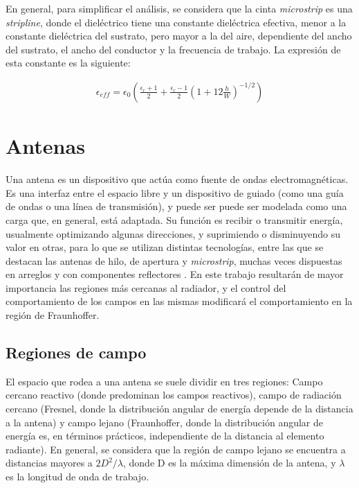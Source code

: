 En general, para simplificar el análisis, se considera que la cinta \textit{microstrip} es una \textit{stripline}, donde el dieléctrico tiene una constante dieléctrica efectiva, menor a la constante dieléctrica del sustrato, pero mayor a la del aire, dependiente del ancho del sustrato, el ancho del conductor y la frecuencia de trabajo. La expresión de esta constante es la siguiente:

\begin{align}
	\epsilon_{eff} = \epsilon_0 \left(\frac{\epsilon_r+1}{2} + \frac{\epsilon_r-1}{2} \left( 1+12 \frac{h}{W} \right)^{-1/2} \right)
	\label{eq:cte-diel-efectiva-microstrip}
\end{align}

\section{Antenas}
\label{subsec_antenas}

Una antena es un dispositivo que actúa como fuente de ondas electromagnéticas. Es una interfaz entre el espacio libre y un dispositivo de guiado (como una guía de ondas o una línea de transmisión), y puede ser puede ser modelada como una carga que, en general, está adaptada. Su función es recibir o transmitir energía, usualmente optimizando algunas direcciones, y suprimiendo o disminuyendo su valor en otras, para lo que se utilizan distintas tecnologías, entre las que se destacan las antenas de hilo, de apertura y \textit{microstrip}, muchas veces dispuestas en arreglos y con componentes reflectores \cite{Balanis:Theory}. En este trabajo resultarán de mayor importancia las regiones más cercanas al radiador, y el control del comportamiento de los campos en las mismas modificará el comportamiento en la región de Fraunhoffer.

\subsection{Regiones de campo}
\label{subsubsec_regiones_de_campo}
El espacio que rodea a una antena se suele dividir en tres regiones: Campo cercano reactivo (donde predominan los campos reactivos), campo de radiación cercano (Fresnel, donde la distribución angular de energía depende de la distancia a la antena) y campo lejano (Fraunhoffer, donde la distribución angular de energía es, en términos prácticos, independiente de la distancia al elemento radiante). En general, se considera que la región de campo lejano se encuentra a distancias mayores a $2D^2/\lambda$, donde D es la máxima dimensión de la antena, y $\lambda$ es la longitud de onda de trabajo.

